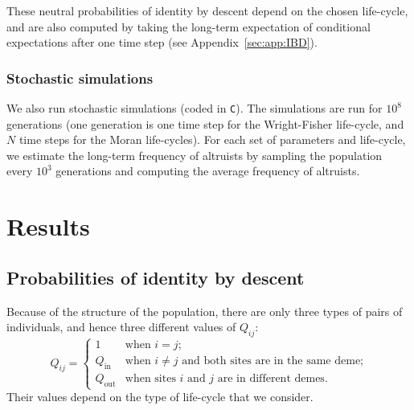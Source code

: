 \documentclass[11pt, letterpaper]{article}
\renewcommand{\eqref}[1]{\textup{{\normalfont eq.~(\ref{#1}}\normalfont)}}
\newcommand{\ie}{\textit{i.e.}}
\newcommand{\appname}[0]{Appendix}
\newcommand{\Qin}{Q_{\textrm{in}}}
\newcommand{\Qout}{Q_{\textrm{out}}}
\begin{document}
These neutral probabilities of identity by descent depend on the chosen life-cycle, and are also computed by taking the long-term expectation of conditional expectations after one time step (see \appname~\ref{sec:app:IBD}). 


\subsubsection{Stochastic simulations}
We also run stochastic simulations (coded in \texttt{C}). The simulations are run for $10^8$ generations (one generation is one time step for the Wright-Fisher life-cycle, and $N$ time steps for the Moran life-cycles). For each set of parameters and life-cycle, we estimate the long-term frequency of altruists by sampling the population every $10^3$ generations and computing the average frequency of altruists. 

\section{Results}

\subsection{Probabilities of identity by descent}


Because of the structure of the population, there are only three types of pairs of individuals, and hence three different values of $Q_{ij}$:
\begin{equation}
Q_{ij} = 
\begin{cases}
1 & \textrm{when $i=j$;}\\
%
\Qin & \textrm{when $i\neq j$ and both sites are in the same deme;}\\
%
\Qout & \textrm{when sites $i$ and $j$ are in different demes.}
\end{cases}
\end{equation}
Their values depend on the type of life-cycle that we consider. 
\end{document}
